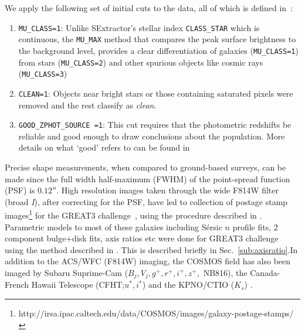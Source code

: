 \documentclass[twocolumn,useAMS,usenatbib]{mn2e}
\newcommand{\rachel}[1]{}
\newcommand{\arun}[1]{}
\newcommand{\sersicn}{S\'{e}rsic $n$ }
\begin{document}
We apply the following set of initial cuts to the data, all of which is defined in~\cite{COSMOS_Alexie}:
\begin{enumerate}
 \item \texttt{MU\_CLASS=1}: Unlike SExtractor's stellar index \texttt{CLASS\_STAR} which is continuous, the \texttt{MU\_MAX} method that compares the peak surface brightness to the background level,
 provides a clear differentiation of galaxies (\texttt{MU\_CLASS=1}) from stars (\texttt{MU\_CLASS=2}) and other spurious objects like cosmic rays (\texttt{MU\_CLASS=3})
 
 \item \texttt{CLEAN=1}: Objects near bright stars or those containing saturated pixels were removed and the rest classify as \emph{clean}.
 
 \item \texttt{GOOD\_ZPHOT\_SOURCE =1}: This cut requires that the photometric redshifts be reliable and good enough to draw conclusions about the population. More details on what `good' refers to can be found in \cite{SHERA}
\rachel{Need to rephrase, at least a little.  I recommend being
  briefer and saying to see that paper for more details.} \arun{Done.}
\end{enumerate}

Precise shape measurements, when compared to ground-based surveys, can be made since the full width half-maximum (FWHM) of the point-spread function (PSF)
is $0.12''$. High resolution images taken through the wide F814W filter (broad \emph{I}), after correcting for the PSF, have led to collection of postage stamp images\footnote{http://irsa.ipac.caltech.edu/data/COSMOS/images/galaxy-postage-stamps/} for the GREAT3 challenge~\citep{great3}, using the procedure described in \cite{SHERA}.
Parametric models to most of these galaxies including \sersicn profile fits, 
2 component bulge+disk fits, axis ratios etc were done for GREAT3 challenge~\citep{great3} using the method described in \cite{Claire_Fits}. This is described briefly in Sec.~\ref{sub:axisratio}.In addition to the ACS/WFC (F814W) imaging, the COSMOS field has also been imaged by Subaru Suprime-Cam ($B_j, V_j, g^+,r^+,i^+,z^+,$ NB816), the
Canada-French Hawaii Telescope (CFHT;$u^*,i^*$) and the KPNO/CTIO ($K_s$) .
	      
\end{document}
